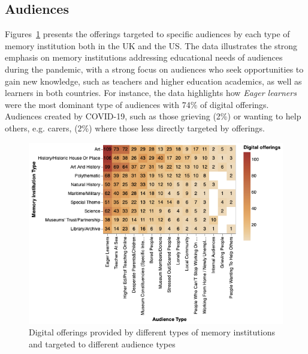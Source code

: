 \documentclass{egpubl}
\begin{document}

\subsection{Audiences}
\label{aud}

Figures~\ref{fig:MTypeAudiences} presents the offerings targeted to specific audiences by each type of memory institution both in the UK and the US. The data illustrates the strong emphasis on memory institutions addressing educational needs of audiences during the pandemic, with a strong focus on audiences who seek opportunities to gain new knowledge, such as teachers and higher education academics, as well as learners in both countries. For instance, the data highlights how \emph{Eager learners} were the most dominant type of audiences with 74\% of digital offerings. Audiences created by COVID-19, such as those grieving (2\%) or wanting to help others, e.g. carers, (2\%) where those less directly targeted by offerings.

\begin{figure}[h]
  \centering
  \includegraphics[width=\linewidth]{images/audiencesboth.png}
  \caption{\label{fig:MTypeAudiences}
           Digital offerings provided by different types of memory institutions and targeted to different audience types}
\end{figure}



\end{document}
